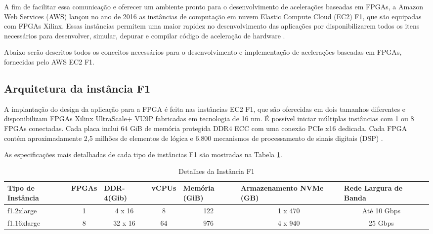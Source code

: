     A fim de facilitar essa comunicação e oferecer um ambiente pronto para o desenvolvimento de acelerações baseadas em FPGAs, a Amazon Web Services (AWS) lançou no ano de 2016 as instâncias de computação em nuvem Elastic Compute Cloud (EC2) F1, que são equipadas com FPGAs Xilinx. Essas instâncias permitem uma maior rapidez no desenvolvimento das aplicações por disponibilizarem todos os itens necessários para desenvolver, simular, depurar e compilar código de aceleração de hardware .
    
    
    
    Abaixo serão descritos todos os conceitos necessários para o desenvolvimento e implementação de acelerações baseadas em FPGAs, fornecidas pelo AWS EC2 F1.
    
    

  
\subsection{Arquitetura da instância F1} \label{sec:arq}
    
    A implantação do design da aplicação para a FPGA é feita nas instâncias EC2 F1, que são oferecidas em dois tamanhos diferentes e disponibilizam FPGAs Xilinx UltraScale+ VU9P fabricadas em tecnologia de 16 nm. É possível iniciar múltiplas instâncias com 1 ou 8 FPGAs conectadas. Cada placa inclui 64 GiB de memória protegida DDR4 ECC com uma conexão PCIe x16 dedicada.  Cada FPGA contém aproximadamente 2,5 milhões de elementos de lógica e 6.800 mecanismos de processamento de sinais digitais (DSP) . %
    
    As especificações mais detalhadas de cada tipo de instâncias F1 são mostradas na Tabela \ref{Tab:F1}. 
        
    \begin{table}[!htb]\tiny
    \centering
     \caption{Detalhes da Instância F1}
    \label{Tab:F1}
    \begin{tabular}{lccccccc}
    \hline
    \multicolumn{1}{l}{Tipo de Instância}&\multicolumn{1}{l}{FPGAs }&\multicolumn{1}{l}{DDR-4(Gib)}&\multicolumn{1}{l}{vCPUs}&\multicolumn{1}{l}{Memória (GiB)}&\multicolumn{1}{l}{Armazenamento NVMe (GB)}&\multicolumn{1}{l}{Rede Largura de Banda} \\ \midrule 
    
    f1.2xlarge & 1 & 4 x 16 & 8 & 122 & 1 x 470 & Até 10 Gbps\\   \midrule
    f1.16xlarge & 8 & 32 x 16 & 64 & 976 & 4 x 940 & 25  Gbps

    \end{tabular}
    \end{table}
    


